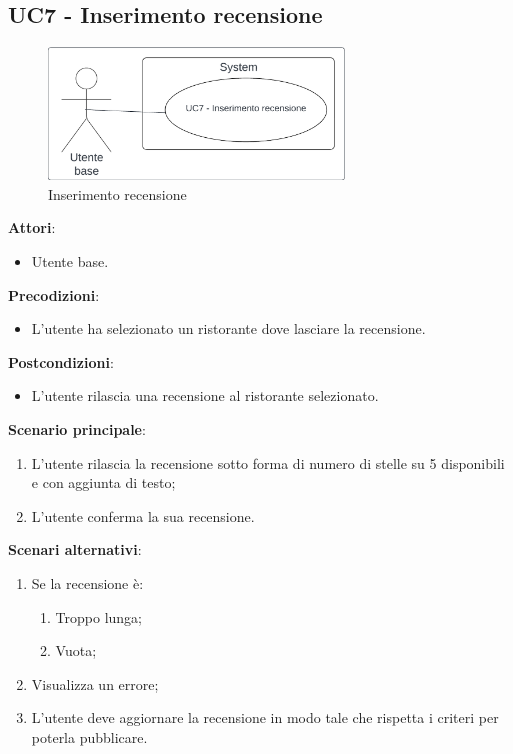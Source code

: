 \subsection{UC7 - Inserimento recensione}\label{usecase:7}
\begin{figure}[H]
  \centering
  \includegraphics[width=0.7\textwidth]{ucd/UCD7.png}
  \caption{Inserimento recensione}
\end{figure}
\textbf{Attori}:
\begin{itemize}
    \item Utente base.
\end{itemize}
\textbf{Precodizioni}:
\begin{itemize}
    \item L'utente ha selezionato un ristorante dove lasciare la recensione.
\end{itemize}
\textbf{Postcondizioni}:
\begin{itemize}
    \item L'utente rilascia una recensione al ristorante selezionato.
\end{itemize}
\textbf{Scenario principale}:
\begin{enumerate}
    \item L'utente rilascia la recensione sotto forma di numero di stelle su 5 disponibili e con aggiunta di testo;
    \item L'utente conferma la sua recensione.
\end{enumerate}
\textbf{Scenari alternativi}:
\begin{enumerate}
    \item Se la recensione è:
    \begin{enumerate}
        \item Troppo lunga;
        \item Vuota;
    \end{enumerate}
    \item Visualizza un errore;
    \item L'utente deve aggiornare la recensione in modo tale che rispetta i criteri per poterla pubblicare.
\end{enumerate}
\newpage